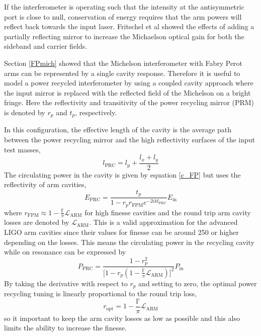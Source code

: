 		If the interferometer is operating such that the intensity at the antisymmetric port is close to null, conservation of energy requires that the arm powers will reflect back towards the input laser.  Fritschel et al \cite{Fritschel_Readout} \cite{FritschelLightRecycling} showed the effects of adding a partially reflecting mirror to increase the Michaelson optical gain for both the sideband and carrier fields.
		
		Section \ref{FPmich} showed that the Michelson interferometer with Fabry Perot arms can be represented by a single cavity response.  Therefore it is useful to model a power recycled interferometer by using a coupled cavity approach where the input mirror is replaced with the reflected field of the Michelson on a bright fringe.  Here the reflectivity and transitivity of the power recycling mirror (PRM) is denoted by $r_p$ and $t_p$, respectively.  
		
		In this configuration, the effective length of the cavity is the average path between the power recycling mirror and the high reflectivity surfaces of the input test masses,
		\begin{equation}
		l_{\text{PRC}} = l_\text{p} + \frac{l_x + l_y}{2}
		\end{equation}
		The circulating power in the cavity is given by equation \ref{c_FP} but uses the reflectivity of arm cavities,
		\begin{equation}
		E_{\text{PRC}} = \frac{t_p}{1- r_p r_{\text{FPM}}   e^{-2ik l_{\text{PRC}}}}E_{\text{in}}
		\end{equation}
		where $r_{\text{FPM}}\approx 1 - \frac{\mathbb{F}}{\pi} \mathcal{L}_{\text{ARM}}$ for high finesse cavities and the round trip arm cavity losses are denoted by $\mathcal{L}_{\text{ARM}}$. This is a valid approximation for the advanced LIGO arm cavities since their values for finesse can be around 250 or higher depending on the losses.  This means the circulating power in the recycling cavity while on resonance can be expressed by
		\begin{equation}
		P_{\text{PRC}} = \frac{1-r_p^2}{\bigg[ 1 - r_p  (1 - \frac{\mathbb{F}}{\pi} \mathcal{L}_{\text{ARM}})   \bigg]^2}P_{\text{in}}
		\end{equation} 
		By taking the derivative with respect to $r_p$ and setting to zero, the optimal power recycling tuning is linearly proportional to the round trip loss,
		\begin{equation}
		r_{\text{opt}}  = 1 - \frac{\mathbb{F}}{\pi}\mathcal{L}_{\text{ARM}}
		\end{equation}
		so it important to keep the arm cavity losses as low as possible and this also limits the ability to increase the finesse.
		
